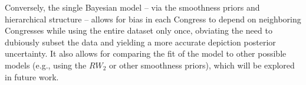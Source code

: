 Conversely, the single Bayesian model -- via the smoothness priors and  
hierarchical structure -- allows for bias in each Congress to depend on neighboring 
Congresses while using the entire dataset only once, obviating the need to dubiously subset 
the data and yielding a more accurate depiction posterior uncertainty. 
It also allows for comparing the fit of the model to other possible models (e.g., using
the $RW_2$ or other smoothness priors), which will be explored in future work. 
